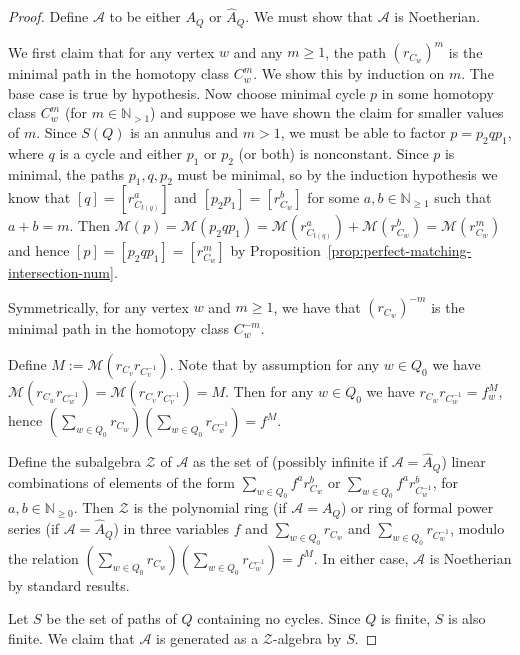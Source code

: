 \documentclass{article}
\theoremstyle{definition}
\newcommand{\A}{{\mathcal A}}
\begin{document}
\begin{proof}
	Define $\A$ to be either $A_Q$ or $\widehat A_Q$. We must show that $\A$ is Noetherian.
	
	We first claim that for any vertex $w$ and any $m\geq1$, the path $(r_{C_w})^m$ is the minimal path in the homotopy class $C_w^m$. We show this by induction on $m$. The base case is true by hypothesis.
	Now choose minimal cycle $p$ in some homotopy class $C_w^m$ (for $m\in\mathbb N_{>1}$) and suppose we have shown the claim for smaller values of $m$.
	Since $S(Q)$ is an annulus and $m>1$, we must be able to factor $p=p_2 q p_1$, where $q$ is a cycle and either $p_1$ or $p_2$ (or both) is nonconstant. Since $p$ is minimal, the paths $p_1,q,p_2$ must be minimal, so by the induction hypothesis we know that $[q]=[r_{C_{t(q)}}^a]$ and $[p_2p_1]=[r_{C_w}^b]$ 
	for some $a,b\in\mathbb N_{\geq1}$ such that $a+b=m$. 
	{Then $\mathcal M(p)=\mathcal M(p_2 qp_1)=\mathcal M(r_{C_{t(q)}}^a)+\mathcal M(r_{C_{w}}^b)=\mathcal M(r_{C_w}^m)$}
	and hence $[p]=[p_2qp_1]=[r_{C_w}^m]$ by Proposition~\ref{prop:perfect-matching-intersection-num}.

	Symmetrically, for any vertex $w$ and $m\geq1$, we have that $(r_{C_w})^{-m}$ is the minimal path in the homotopy class $C_w^{-m}$.

	Define $M:=\mathcal M(r_{C_v}r_{C_v^{-1}})$.
	Note that by assumption for any $w\in Q_0$ we have 
	$\mathcal M(r_{C_w}r_{C_{w}^{-1}})=\mathcal M(r_{C_v}r_{C_{v}^{-1}})=M$. Then for any $w\in Q_0$ we have $r_{C_w}r_{C_w^{-1}}=f_w^M$, hence $\left(\sum_{w\in Q_0}r_{C_w}\right)\left(\sum_{w\in Q_0}r_{C_w^{-1}}\right)=f^M$.

	Define the subalgebra $\mathcal Z$ of $\mathcal A$ as the set of (possibly infinite if $\mathcal A=\widehat A_Q$) linear combinations of elements of the form $\sum_{w\in Q_0}f^ar_{C_w}^b$ or $\sum_{w\in Q_0}f^ar_{C_w^{-1}}^b$, for $a,b\in\mathbb N_{\geq0}$.
	Then $\mathcal Z$ is the polynomial ring (if $\mathcal A=A_Q$) or ring of formal power series (if $\mathcal A=\widehat A_Q$) in three variables $f$ and $\sum_{w\in Q_0}r_{C_w}$ and $\sum_{w\in Q_0}r_{C_w^{-1}}$, modulo the relation
	$\left(\sum_{w\in Q_0}r_{C_w}\right)\left(\sum_{w\in Q_0}r_{C_w^{-1}}\right)=f^M$.
	In either case, $\mathcal A$ is Noetherian by standard results.

	Let $S$ be the set of paths of $Q$ containing no cycles. Since $Q$ is finite, $S$ is also finite.
	We claim that $\mathcal A$ is generated as a $\mathcal Z$-algebra by $S$.


\end{proof}
\end{document}
